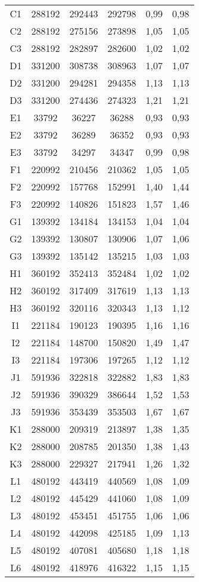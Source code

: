 \begin{center}
\begin{longtable}{cccccc}
    C1    & 288192 & 292443 & 292798 & 0,99  & 0,98 \\
    C2    & 288192 & 275156 & 273898 & 1,05  & 1,05 \\
    C3    & 288192 & 282897 & 282600 & 1,02  & 1,02 \\
    D1    & 331200 & 308738 & 308963 & 1,07  & 1,07 \\
    D2    & 331200 & 294281 & 294358 & 1,13  & 1,13 \\
    D3    & 331200 & 274436 & 274323 & 1,21  & 1,21 \\
    E1    & 33792 & 36227 & 36288 & 0,93  & 0,93 \\
    E2    & 33792 & 36289 & 36352 & 0,93  & 0,93 \\
    E3    & 33792 & 34297 & 34347 & 0,99  & 0,98 \\
    F1    & 220992 & 210456 & 210362 & 1,05  & 1,05 \\
    F2    & 220992 & 157768 & 152991 & 1,40  & 1,44 \\
    F3    & 220992 & 140826 & 151823 & 1,57  & 1,46 \\
    G1    & 139392 & 134184 & 134153 & 1,04  & 1,04 \\
    G2    & 139392 & 130807 & 130906 & 1,07  & 1,06 \\
    G3    & 139392 & 135142 & 135215 & 1,03  & 1,03 \\
    H1    & 360192 & 352413 & 352484 & 1,02  & 1,02 \\
    H2    & 360192 & 317409 & 317619 & 1,13  & 1,13 \\
    H3    & 360192 & 320116 & 320343 & 1,13  & 1,12 \\
    I1    & 221184 & 190123 & 190395 & 1,16  & 1,16 \\
    I2    & 221184 & 148700 & 150820 & 1,49  & 1,47 \\
    I3    & 221184 & 197306 & 197265 & 1,12  & 1,12 \\
    J1    & 591936 & 322818 & 322882 & 1,83  & 1,83 \\
    J2    & 591936 & 390329 & 386644 & 1,52  & 1,53 \\
    J3    & 591936 & 353439 & 353503 & 1,67  & 1,67 \\
    K1    & 288000 & 209319 & 213897 & 1,38  & 1,35 \\
    K2    & 288000 & 208785 & 201350 & 1,38  & 1,43 \\
    K3    & 288000 & 229327 & 217941 & 1,26  & 1,32 \\
    L1    & 480192 & 443419 & 440569 & 1,08  & 1,09 \\
    L2    & 480192 & 445429 & 441060 & 1,08  & 1,09 \\
    L3    & 480192 & 453451 & 451755 & 1,06  & 1,06 \\
    L4    & 480192 & 442098 & 425185 & 1,09  & 1,13 \\
    L5    & 480192 & 407081 & 405680 & 1,18  & 1,18 \\
    L6    & 480192 & 418976 & 416322 & 1,15  & 1,15 \\
\end{longtable}
\end{center}

